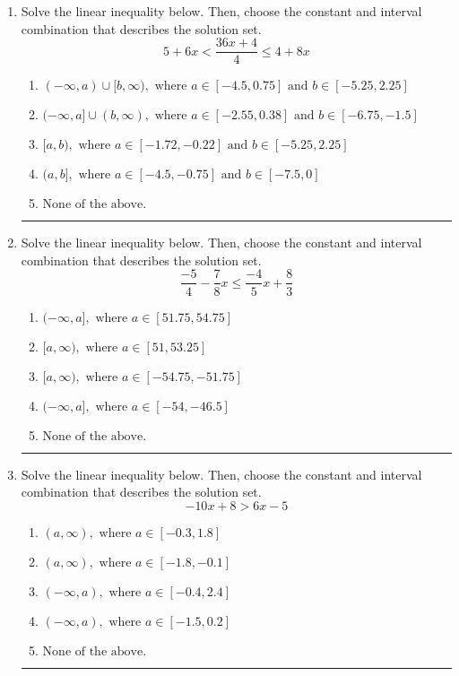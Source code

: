 \documentclass[14pt]{extbook}
\newcommand{\litem}[1]{\item#1\hspace*{-1cm}\rule{\textwidth}{0.4pt}}
\begin{document}
\begin{enumerate}
\litem{
Solve the linear inequality below. Then, choose the constant and interval combination that describes the solution set.\[ 5 + 6 x < \frac{36 x + 4}{4} \leq 4 + 8 x \]\begin{enumerate}[label=\Alph*.]
\item \( (-\infty, a) \cup [b, \infty), \text{ where } a \in [-4.5, 0.75] \text{ and } b \in [-5.25, 2.25] \)
\item \( (-\infty, a] \cup (b, \infty), \text{ where } a \in [-2.55, 0.38] \text{ and } b \in [-6.75, -1.5] \)
\item \( [a, b), \text{ where } a \in [-1.72, -0.22] \text{ and } b \in [-5.25, 2.25] \)
\item \( (a, b], \text{ where } a \in [-4.5, -0.75] \text{ and } b \in [-7.5, 0] \)
\item \( \text{None of the above.} \)

\end{enumerate} }
\litem{
Solve the linear inequality below. Then, choose the constant and interval combination that describes the solution set.\[ \frac{-5}{4} - \frac{7}{8} x \leq \frac{-4}{5} x + \frac{8}{3} \]\begin{enumerate}[label=\Alph*.]
\item \( (-\infty, a], \text{ where } a \in [51.75, 54.75] \)
\item \( [a, \infty), \text{ where } a \in [51, 53.25] \)
\item \( [a, \infty), \text{ where } a \in [-54.75, -51.75] \)
\item \( (-\infty, a], \text{ where } a \in [-54, -46.5] \)
\item \( \text{None of the above}. \)

\end{enumerate} }
\litem{
Solve the linear inequality below. Then, choose the constant and interval combination that describes the solution set.\[ -10x + 8 > 6x -5 \]\begin{enumerate}[label=\Alph*.]
\item \( (a, \infty), \text{ where } a \in [-0.3, 1.8] \)
\item \( (a, \infty), \text{ where } a \in [-1.8, -0.1] \)
\item \( (-\infty, a), \text{ where } a \in [-0.4, 2.4] \)
\item \( (-\infty, a), \text{ where } a \in [-1.5, 0.2] \)
\item \( \text{None of the above}. \)


\end{enumerate}}
\end{enumerate}
\end{document}
